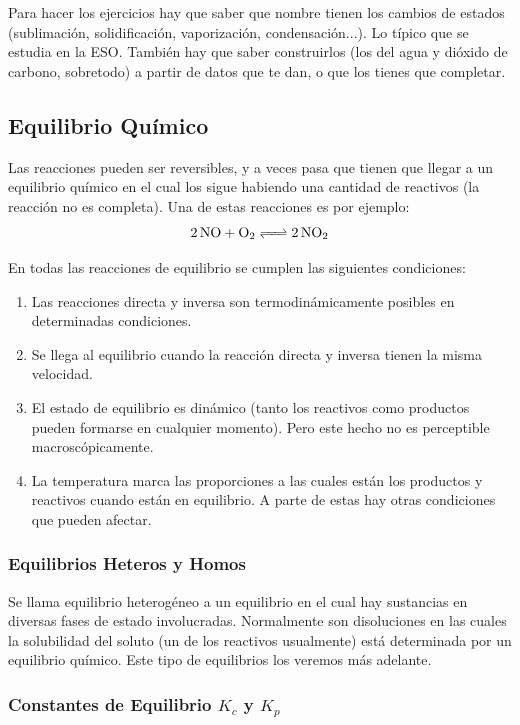 \documentclass[arial,a4paper,print]{article}
\begin{document}
Para hacer los ejercicios hay que saber que nombre tienen los cambios de estados (sublimación, solidificación, vaporización, condensación...). Lo típico que se estudia en la ESO. También hay que saber construirlos (los del agua y dióxido de carbono, sobretodo) a partir de datos que te dan, o que los tienes que completar. 

\subsection{Equilibrio Químico}

Las reacciones pueden ser reversibles, y a veces pasa que tienen que llegar a un equilibrio químico en el cual los sigue habiendo una cantidad de reactivos (la reacción no es completa). Una de estas reacciones es por ejemplo:
\begin{equation*}
	\ce{2NO + O_2 <=> 2NO2}
\end{equation*}

En todas las reacciones de equilibrio se cumplen las siguientes condiciones:
\begin{enumerate}
\item Las reacciones directa y inversa son termodinámicamente posibles en determinadas condiciones.
\item Se llega al equilibrio cuando la reacción directa y inversa tienen la misma velocidad. 
\item El estado de equilibrio es dinámico (tanto los reactivos como productos pueden formarse en cualquier momento). Pero este hecho no es perceptible macroscópicamente. 
\item La temperatura marca las proporciones a las cuales están los productos y reactivos cuando están en equilibrio. A parte de estas hay otras condiciones que pueden afectar. 
\end{enumerate}

\subsubsection{Equilibrios Heteros y Homos}
Se llama equilibrio heterogéneo a un equilibrio en el cual hay sustancias en diversas fases de estado involucradas. Normalmente son disoluciones en las cuales la solubilidad del soluto (un de los reactivos usualmente) está determinada por un equilibrio químico. Este tipo de equilibrios los veremos más adelante. 

\subsubsection{Constantes de Equilibrio $K_{c}$ y $K_{p}$}
\end{document}
